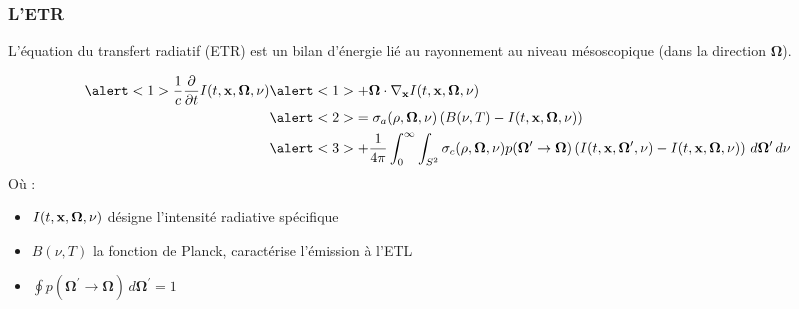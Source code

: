 \begin{frame}
  \frametitle{L'ETR}
  L'équation du transfert radiatif (ETR) est un bilan d'énergie lié au rayonnement au niveau mésoscopique (dans la direction $\bm{\Omega}$). 

  \begingroup
  \scriptsize
  \begin{gather*}
      \begin{aligned}
        \alert<1>{\frac{1}{c} \frac{\partial}{\partial t}I(t,\bvec{x},\bm{\Omega},\nu)} &\alert<1>{+\bm{\Omega}\cdot\nabla_{\bvec{x}} I(t,\bvec{x},\bm{\Omega},\nu)} \\
      &\alert<2>{= \sigma_a(\rho,\bm{\Omega},\nu)\left(B(\nu,T)-I(t,\bvec{x},\bm{\Omega},\nu)\right)} \\
      &\alert<3>{+ \frac{1}{4\pi} \int_{0}^{\infty} \int_{S^2}\sigma_c(\rho,\bm{\Omega},\nu)p(\bm{\Omega}^\prime\rightarrow\bm{\Omega})\left(I(t,\bvec{x},\bm{\Omega}^\prime,\nu)-I(t,\bvec{x},\bm{\Omega},\nu)\right) \, d\bm{\Omega}^\prime \, d\nu}
      \end{aligned}
  \end{gather*}
  \endgroup
Où :
\begin{itemize}
  \item $I(t,\textbf{x},\bm{\Omega},\nu)$ désigne l'intensité radiative spécifique
  \item $B(\nu,T)$ la fonction de Planck, caractérise l'émission à l'ETL
  \item $\oint p(\bm{\Omega}^\prime\rightarrow\bm{\Omega})\, d\bm{\Omega}^\prime=1$
\end{itemize}

\end{frame}

